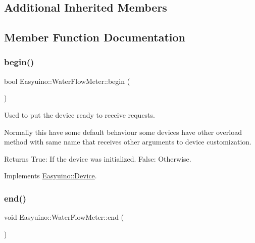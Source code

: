 \subsection*{Additional Inherited Members}


\subsection{Member Function Documentation}
\mbox{\label{class_easyuino_1_1_water_flow_meter_a400c25b10a7cde45c623805546d071cd}} 
\subsubsection{\texorpdfstring{begin()}{begin()}}
{\footnotesize\ttfamily bool Easyuino\+::\+Water\+Flow\+Meter\+::begin (\begin{DoxyParamCaption}{ }\end{DoxyParamCaption})\hspace{0.3cm}{\ttfamily [virtual]}}



Used to put the device ready to receive requests. 

Normally this have some default behaviour some devices have other overload method with same name that receives other arguments to device customization. \begin{DoxyReturn}{Returns}
True\+: If the device was initialized. False\+: Otherwise. 
\end{DoxyReturn}


Implements \hyperlink{class_easyuino_1_1_device_a2e7bb2fec849719a9d9432b57cdb72ba}{Easyuino\+::\+Device}.

\mbox{\label{class_easyuino_1_1_water_flow_meter_a47024d4da9568e42743a875c08c33121}} 
\subsubsection{\texorpdfstring{end()}{end()}}
{\footnotesize\ttfamily void Easyuino\+::\+Water\+Flow\+Meter\+::end (\begin{DoxyParamCaption}{ }\end{DoxyParamCaption})\hspace{0.3cm}{\ttfamily [virtual]}}



